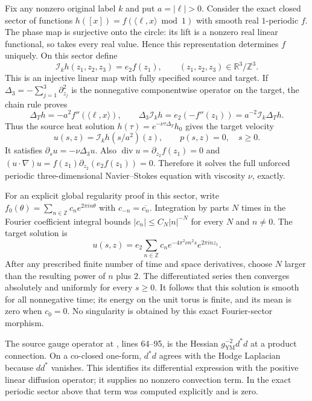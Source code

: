 Fix any nonzero original label $k$ and put $a=|\ell|>0$.
Consider the exact closed sector of functions
$h([x])=f(\langle\ell,x\rangle\bmod1)$ with smooth real $1$-periodic $f$.
The phase map is surjective onto the circle: its lift is a nonzero real
linear functional, so takes every real value.  Hence this representation
determines $f$ uniquely.  On this sector define
\[
 \mathcal I_k h(z_1,z_2,z_3)=e_2 f(z_1),
 \qquad (z_1,z_2,z_3)\in\mathbb R^3/\mathbb Z^3.
\]
This is an injective linear map with fully specified source and target.
If $\Delta_3=-\sum_{j=1}^3\partial_{z_j}^2$ is the nonnegative
componentwise operator on the target, the chain rule proves
\[
 \Delta_T h=-a^2f''(\langle\ell,x\rangle),\qquad
 \Delta_3\mathcal I_kh=e_2(-f''(z_1))
   =a^{-2}\mathcal I_k\Delta_T h.
\]
Thus the source heat solution $h(\tau)=e^{-\nu\tau\Delta_T}h_0$
gives the target velocity
\[
 u(s,z)=\mathcal I_k h(s/a^2)(z),\qquad p(s,z)=0,
 \quad s\ge0.
\]
It satisfies $\partial_su=-\nu\Delta_3u$.  Also
$\operatorname{div}u=\partial_{z_2}f(z_1)=0$ and
$(u\cdot\nabla)u=f(z_1)\partial_{z_2}(e_2f(z_1))=0$.
Therefore it solves the full unforced periodic three-dimensional
Navier--Stokes equation with viscosity $\nu$, exactly.

For an explicit global regularity proof in this sector, write
$f_0(\theta)=\sum_{n\in\mathbb Z}c_ne^{2\pi in\theta}$ with
$c_{-n}=\overline{c_n}$.  Integration by parts $N$ times in the Fourier
coefficient integral bounds $|c_n|\le C_N|n|^{-N}$ for every $N$ and
$n\ne0$.  The target solution is
\[
 u(s,z)=e_2\sum_{n\in\mathbb Z}
        c_n e^{-4\pi^2\nu n^2s}e^{2\pi in z_1}.
\]
After any prescribed finite number of time and space derivatives, choose
$N$ larger than the resulting power of $n$ plus $2$.  The differentiated
series then converges absolutely and uniformly for every $s\ge0$.
It follows that this solution is smooth for all nonnegative time; its
energy on the unit torus is finite, and its mean is zero when $c_0=0$.
No singularity is obtained by this exact Fourier-sector morphism.

The source gauge operator at
,
lines 64--95, is the Hessian $g_{\mathrm{YM}}^{-2}d^*d$ at a product
connection.  On a co-closed one-form, $d^*d$ agrees with the Hodge
Laplacian because $dd^*$ vanishes.  This identifies its differential
expression with the positive linear diffusion operator; it supplies no
nonzero convection term.  In the exact periodic sector above that
term was computed explicitly and is zero.

